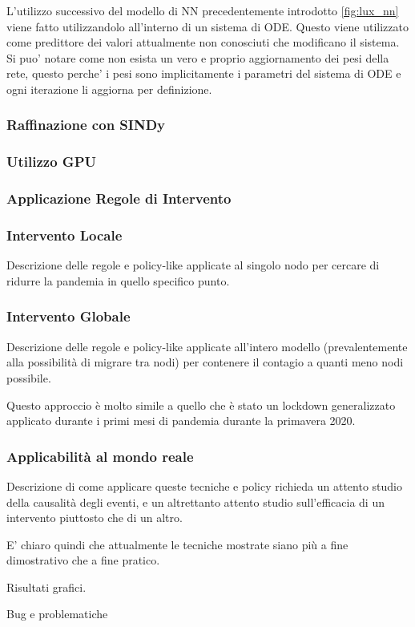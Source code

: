 L'utilizzo successivo del modello di NN precedentemente introdotto \ref{fig:lux_nn} viene fatto 
utilizzandolo all'interno di un sistema di ODE. Questo viene utilizzato come predittore 
dei valori attualmente non conosciuti che modificano il sistema. Si puo' notare come non esista un 
vero e proprio aggiornamento dei pesi della rete, questo perche' i pesi sono implicitamente i parametri
del sistema di ODE e ogni iterazione li aggiorna per definizione.

\subsubsection*{Raffinazione con SINDy}

\subsubsection*{Utilizzo GPU}

\subsubsection{Applicazione Regole di Intervento}

\subsubsection*{Intervento Locale}
Descrizione delle regole e policy-like applicate al 
singolo nodo per cercare di ridurre la pandemia in quello 
specifico punto.

\subsubsection*{Intervento Globale}
Descrizione delle regole e policy-like applicate all'intero
modello (prevalentemente alla possibilità di migrare tra nodi)
per contenere il contagio a quanti meno nodi possibile.

Questo approccio è molto simile a quello che è stato un lockdown 
generalizzato applicato durante i primi mesi di pandemia durante la 
primavera 2020. 

\subsubsection{Applicabilità al mondo reale}
Descrizione di come applicare queste tecniche e policy richieda
un attento studio della causalità degli eventi, e un altrettanto 
attento studio sull'efficacia di un intervento piuttosto che di un altro.

E' chiaro quindi che attualmente le tecniche mostrate siano più 
a fine dimostrativo che a fine pratico.

Risultati grafici.

Bug e problematiche